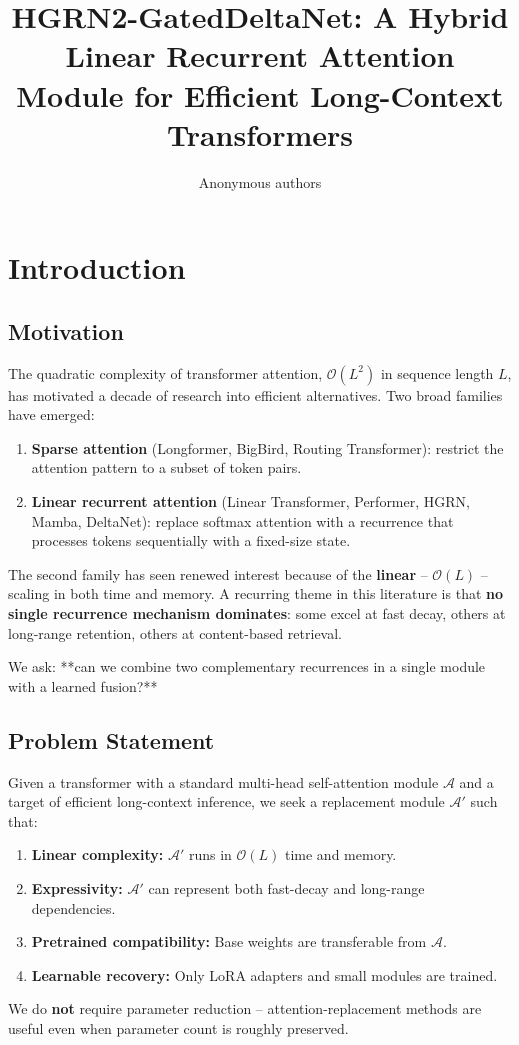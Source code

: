 \title{\textbf{HGRN2-GatedDeltaNet: A Hybrid Linear Recurrent Attention Module for Efficient Long-Context Transformers}}

\author{Anonymous authors}


\section{Introduction}

\subsection{Motivation}

The quadratic complexity of transformer attention, $\mathcal{O}(L^2)$ in 
sequence length $L$, has motivated a decade of research into efficient 
alternatives. Two broad families have emerged:

\begin{enumerate}
\item \textbf{Sparse attention} (Longformer, BigBird, Routing Transformer): restrict
  the attention pattern to a subset of token pairs.
\item \textbf{Linear recurrent attention} (Linear Transformer, Performer, HGRN, Mamba,
  DeltaNet): replace softmax attention with a recurrence that processes
  tokens sequentially with a fixed-size state.

\end{enumerate}
The second family has seen renewed interest because of the \textbf{linear} -- 
$\mathcal{O}(L)$ -- scaling in both time and memory. A recurring theme in this 
literature is that \textbf{no single recurrence mechanism dominates}: some excel 
at fast decay, others at long-range retention, others at content-based 
retrieval.

We ask: **can we combine two complementary recurrences in a single module 
with a learned fusion?**

\subsection{Problem Statement}

Given a transformer with a standard multi-head self-attention module 
$\mathcal{A}$ and a target of efficient long-context inference, we seek a 
replacement module $\mathcal{A}'$ such that:

\begin{enumerate}
\item \textbf{Linear complexity:} $\mathcal{A}'$ runs in $\mathcal{O}(L)$ time and memory.
\item \textbf{Expressivity:} $\mathcal{A}'$ can represent both fast-decay and
  long-range dependencies.
\item \textbf{Pretrained compatibility:} Base weights are transferable from $\mathcal{A}$.
\item \textbf{Learnable recovery:} Only LoRA adapters and small modules are trained.

\end{enumerate}
We do \textbf{not} require parameter reduction -- attention-replacement methods 
are useful even when parameter count is roughly preserved.

